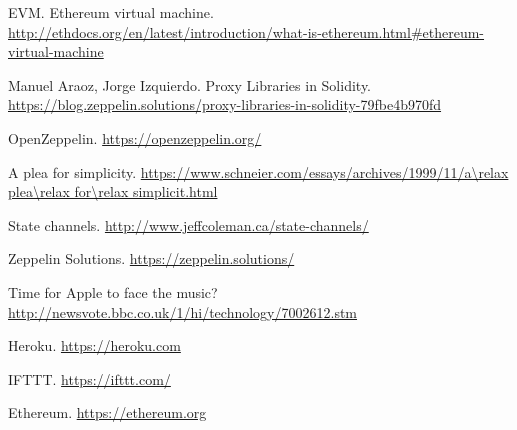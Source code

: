\documentclass[]{article}
\makeatletter
\let\_\relax
\DeclareRobustCommand{\_}{%
  \leavevmode\vbox{%
    \hrule\@width.5em
          \@height-.26ex
          \@depth\dimexpr.26ex+.28pt\relax}}
\makeatother
\begin{document}
\vfill

%
%
%
%
%
%
%

\clearpage

\begin{thebibliography}{20}

EVM. Ethereum virtual machine. \url{http://ethdocs.org/en/latest/introduction/what-is-ethereum.html\#ethereum-virtual-machine}

Manuel Araoz, Jorge Izquierdo. Proxy Libraries in Solidity. \url{https://blog.zeppelin.solutions/proxy-libraries-in-solidity-79fbe4b970fd}

OpenZeppelin. \url{https://openzeppelin.org/}

A plea for simplicity. \url{https://www.schneier.com/essays/archives/1999/11/a\_plea\_for\_simplicit.html}

State channels. \url{http://www.jeffcoleman.ca/state-channels/}

Zeppelin Solutions. \url{https://zeppelin.solutions/}

Time for Apple to face the music? \url{http://newsvote.bbc.co.uk/1/hi/technology/7002612.stm}

Heroku. \url{https://heroku.com}

IFTTT. \url{https://ifttt.com/}

Ethereum. \url{https://ethereum.org}

\end{thebibliography}
\end{document}
